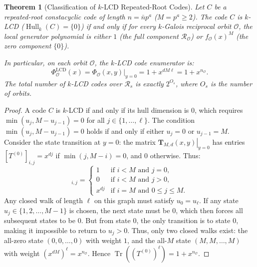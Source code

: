 \documentclass[preprint,12pt]{elsarticle}
\newcommand{\Tr}{\operatorname{Tr}}
\numberwithin{equation}{section}
\theoremstyle{plain}
\newtheorem{theorem}{Theorem}[section]
\theoremstyle{definition}
\theoremstyle{remark}
\begin{document}
\begin{theorem}[Classification of $k$-LCD Repeated-Root Codes]\label{thm:lcd_classification}
Let $C$ be a repeated-root constacyclic code of length $n = \bar{n} p^a$ ($M = p^a \ge 2$). The code $C$ is $k$-LCD ($\operatorname{Hull}_k(C) = \{0\}$) if and only if for every $k$-Galois reciprocal orbit $\mathcal{O}$, the local generator polynomial is either $1$ (the full component $\mathcal{R}_{\mathcal{O}}$) or $f_{\mathcal{O}}(x)^M$ (the zero component $\{0\}$). 

In particular, on each orbit $\mathcal{O}$, the $k$-LCD code enumerator is:
\begin{equation}\label{eq:lcd_enumerator}
    \Phi_{\mathcal{O}}^{\mathrm{LCD}}(x) = \left. \Phi_{\mathcal{O}}(x, y) \right|_{y=0} = 1 + x^{d M \ell} = 1 + x^{n_{\mathcal{O}}}.
\end{equation}
The total number of $k$-LCD codes over $\mathcal{R}_s$ is exactly $2^{O_s}$, where $O_s$ is the number of orbits.
\end{theorem}
\begin{proof}
A code $C$ is $k$-LCD if and only if its hull dimension is $0$, which requires $\min(u_j, M - u_{j-1}) = 0$ for all $j \in \{1, \dots, \ell\}$. The condition $\min(u_j, M - u_{j-1}) = 0$ holds if and only if either $u_j = 0$ or $u_{j-1} = M$. 
Consider the state transition at $y = 0$: the matrix $\left.\mathbf{T}_{M, d}(x, y)\right|_{y=0}$ has entries $[T^{(0)}]_{i, j} = x^{d j}$ if $\min(j, M - i) = 0$, and $0$ otherwise. Thus:
\begin{equation}
    [T^{(0)}]_{i, j} = \begin{cases}
        1 & \text{if } i < M \text{ and } j = 0, \\
        0 & \text{if } i < M \text{ and } j > 0, \\
        x^{d j} & \text{if } i = M \text{ and } 0 \le j \le M.
    \end{cases}
\end{equation}
Any closed walk of length $\ell$ on this graph must satisfy $u_0 = u_\ell$. If any state $u_j \in \{1, 2, \dots, M-1\}$ is chosen, the next state must be $0$, which then forces all subsequent states to be $0$. But from state $0$, the only transition is to state $0$, making it impossible to return to $u_j > 0$. Thus, only two closed walks exist: the all-zero state $(0, 0, \dots, 0)$ with weight $1$, and the all-$M$ state $(M, M, \dots, M)$ with weight $(x^{d M})^\ell = x^{n_{\mathcal{O}}}$. Hence $\Tr((T^{(0)})^\ell) = 1 + x^{n_{\mathcal{O}}}$.
\end{proof}
\end{document}
